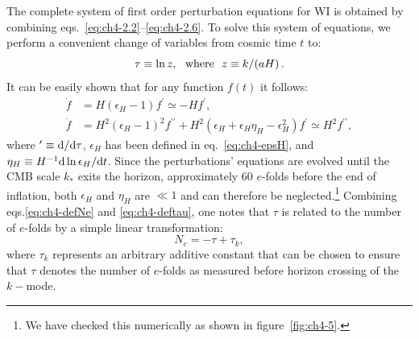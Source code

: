 The complete system of first order perturbation equations for WI is obtained by combining eqs.~\eqref{eq:ch4-2.2}--\eqref{eq:ch4-2.6}. To solve this system of equations, we perform a convenient change of variables from cosmic time $t$ to: 
\begin{equation}
    \tau\equiv\ln z, \,\,\,\, {\rm{ where}} \,\,\,\, z\equiv k/(aH) \, . \label{eq:ch4-deftau}
    \end{equation}
    It can be easily shown that for any function $f(t)$ it follows:
\begin{align}
    \dot{f}  &= H(\epsilon_H-1)f^{\prime}\simeq -H f^{\prime} , \label{eq:ch4-chain_rule1}\\
    \ddot{f} &= H^2(\epsilon_H-1)^2 f^{\prime\prime}+H^2(\epsilon_H+\epsilon_H\eta_H-\epsilon_H^2)f^{\prime}\simeq H^2 f^{\prime\prime}, \label{eq:ch4-chain_rule2}
\end{align}
where $^\prime \equiv {\rm d}/{\rm d}\tau$, $\epsilon_H$ has been defined in eq.~\eqref{eq:ch4-epsH}, and $\eta_H\equiv H^{-1}{\rm d}\ln\epsilon_H/{\rm d}t$. Since the perturbations' equations are evolved until the CMB scale $k_{*}$ exits the horizon, approximately 60 $e$-folds before the end of inflation, both $\epsilon_H$ and $\eta_H$ are $\ll 1$  and can therefore be neglected.\footnote{We have checked this numerically as shown in figure~\ref{fig:ch4-5}.} Combining eqs.\ref{eq:ch4-defNe} and \ref{eq:ch4-deftau}, one notes that $\tau$  is related to the
number of $e$-folds by a simple linear transformation:
\begin{equation}
    N_e=-\tau+ \tau_k, \label{eq:ch4-Netotau}
\end{equation}
where $\tau_k$ represents an arbitrary additive constant that can be chosen to ensure that $\tau$ denotes the number of $e$-folds as measured before horizon crossing of the $k-$mode. 

